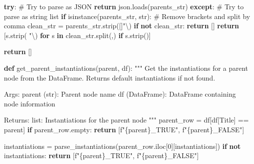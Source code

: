 \documentclass[
  11pt,
  letterpaper,
]{book}
\newenvironment{Shaded}{\begin{snugshade}}{\end{snugshade}}
\newcommand{\BuiltInTok}[1]{\textcolor[rgb]{0.00,0.23,0.31}{#1}}
\newcommand{\CharTok}[1]{\textcolor[rgb]{0.13,0.47,0.30}{#1}}
\newcommand{\CommentTok}[1]{\textcolor[rgb]{0.37,0.37,0.37}{#1}}
\newcommand{\ControlFlowTok}[1]{\textcolor[rgb]{0.00,0.23,0.31}{\textbf{#1}}}
\newcommand{\DecValTok}[1]{\textcolor[rgb]{0.68,0.00,0.00}{#1}}
\newcommand{\KeywordTok}[1]{\textcolor[rgb]{0.00,0.23,0.31}{\textbf{#1}}}
\newcommand{\NormalTok}[1]{\textcolor[rgb]{0.00,0.23,0.31}{#1}}
\newcommand{\OperatorTok}[1]{\textcolor[rgb]{0.37,0.37,0.37}{#1}}
\newcommand{\SpecialCharTok}[1]{\textcolor[rgb]{0.37,0.37,0.37}{#1}}
\newcommand{\SpecialStringTok}[1]{\textcolor[rgb]{0.13,0.47,0.30}{#1}}
\newcommand{\StringTok}[1]{\textcolor[rgb]{0.13,0.47,0.30}{#1}}
\begin{document}
\begin{Shaded}
\begin{Highlighting}[]
    \ControlFlowTok{try}\NormalTok{:}
        \CommentTok{\# Try to parse as JSON}
        \ControlFlowTok{return}\NormalTok{ json.loads(parents\_str)}
    \ControlFlowTok{except}\NormalTok{:}
        \CommentTok{\# Try to parse as string list}
        \ControlFlowTok{if} \BuiltInTok{isinstance}\NormalTok{(parents\_str, }\BuiltInTok{str}\NormalTok{):}
            \CommentTok{\# Remove brackets and split by comma}
\NormalTok{            clean\_str }\OperatorTok{=}\NormalTok{ parents\_str.strip(}\StringTok{\textquotesingle{}[]"}\CharTok{\textbackslash{}\textquotesingle{}}\StringTok{\textquotesingle{}}\NormalTok{)}
            \ControlFlowTok{if} \KeywordTok{not}\NormalTok{ clean\_str:}
                \ControlFlowTok{return}\NormalTok{ []}
            \ControlFlowTok{return}\NormalTok{ [s.strip(}\StringTok{\textquotesingle{} "}\CharTok{\textbackslash{}\textquotesingle{}}\StringTok{\textquotesingle{}}\NormalTok{) }\ControlFlowTok{for}\NormalTok{ s }\KeywordTok{in}\NormalTok{ clean\_str.split(}\StringTok{\textquotesingle{},\textquotesingle{}}\NormalTok{) }\ControlFlowTok{if}\NormalTok{ s.strip()]}

    \ControlFlowTok{return}\NormalTok{ []}

\KeywordTok{def}\NormalTok{ get\_parent\_instantiations(parent, df):}
    \CommentTok{"""}
\CommentTok{    Get the instantiations for a parent node from the DataFrame.}
\CommentTok{    Returns default instantiations if not found.}

\CommentTok{    Args:}
\CommentTok{        parent (str): Parent node name}
\CommentTok{        df (DataFrame): DataFrame containing node information}

\CommentTok{    Returns:}
\CommentTok{        list: Instantiations for the parent node}
\CommentTok{    """}
\NormalTok{    parent\_row }\OperatorTok{=}\NormalTok{ df[df[}\StringTok{\textquotesingle{}Title\textquotesingle{}}\NormalTok{] }\OperatorTok{==}\NormalTok{ parent]}
    \ControlFlowTok{if}\NormalTok{ parent\_row.empty:}
        \ControlFlowTok{return}\NormalTok{ [}\SpecialStringTok{f"}\SpecialCharTok{\{}\NormalTok{parent}\SpecialCharTok{\}}\SpecialStringTok{\_TRUE"}\NormalTok{, }\SpecialStringTok{f"}\SpecialCharTok{\{}\NormalTok{parent}\SpecialCharTok{\}}\SpecialStringTok{\_FALSE"}\NormalTok{]}

\NormalTok{    instantiations }\OperatorTok{=}\NormalTok{ parse\_instantiations(parent\_row.iloc[}\DecValTok{0}\NormalTok{][}\StringTok{\textquotesingle{}instantiations\textquotesingle{}}\NormalTok{])}
    \ControlFlowTok{if} \KeywordTok{not}\NormalTok{ instantiations:}
        \ControlFlowTok{return}\NormalTok{ [}\SpecialStringTok{f"}\SpecialCharTok{\{}\NormalTok{parent}\SpecialCharTok{\}}\SpecialStringTok{\_TRUE"}\NormalTok{, }\SpecialStringTok{f"}\SpecialCharTok{\{}\NormalTok{parent}\SpecialCharTok{\}}\SpecialStringTok{\_FALSE"}\NormalTok{]}


\end{Highlighting}
\end{Shaded}
\end{document}

